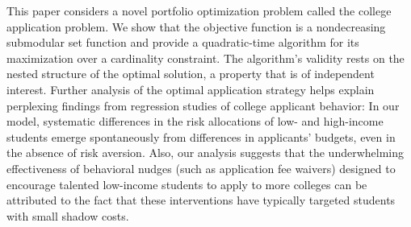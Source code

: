 This paper considers a novel portfolio optimization problem called the college application
problem. We show that the objective function is a nondecreasing submodular set function
and provide a quadratic-time algorithm for its maximization over a cardinality
constraint. The algorithm's validity rests on the nested structure of the optimal solution,
a property that is of independent interest. Further analysis of the optimal application strategy
helps explain perplexing findings from regression studies of college applicant behavior:
In our model, systematic differences in the risk allocations of low- and high-income students
emerge spontaneously from differences in applicants' budgets, even in the absence of risk aversion.
Also, our analysis suggests that the underwhelming effectiveness of behavioral nudges
(such as application fee waivers) designed to encourage talented low-income students to apply
to more colleges can be attributed to the fact that these interventions have typically targeted
students with small shadow costs.
